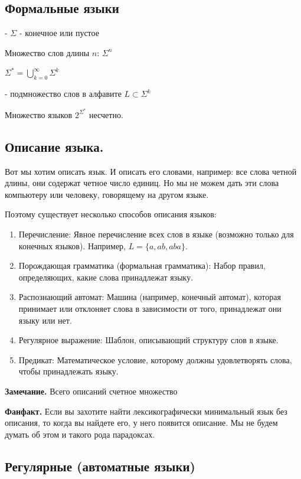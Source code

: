 \subsection{Формальные языки}

 - $\Sigma$ - конечное или пустое

Множество слов длины $n$: $\Sigma^n$ 

$\Sigma^*=\bigcup\limits_{k=0}^\infty \Sigma^k$

 - подмножество слов в алфавите $L \subset \Sigma^k$

 Множество языков $2^{\Sigma^* }$ несчетно.

\subsection{Описание языка.}

Вот мы хотим описать язык. И описать его словами, например: все слова четной длины, они содержат четное число единиц. Но мы не можем дать эти слова компьютеру или человеку, говорящему на другом языке. 

Поэтому существует несколько способов описания языков:
\begin{enumerate}
    \item Перечисление: Явное перечисление всех слов в языке (возможно только для конечных языков). Например, $L = \{a, ab, aba\}$.
    \item Порождающая грамматика (формальная грамматика): Набор правил, определяющих, какие слова принадлежат языку.
    \item Распознающий автомат: Машина (например, конечный автомат), которая принимает или отклоняет слова в зависимости от того, принадлежат они языку или нет.
    \item Регулярное выражение: Шаблон, описывающий структуру слов в языке.
    \item  Предикат: Математическое условие, которому должны удовлетворять слова, чтобы принадлежать языку. 
\end{enumerate}

\textbf{Замечание.} Всего описаний счетное множество

\textbf{Фанфакт.} Если вы захотите найти лексикографически минимальный язык без описания, то когда вы найдете его, у него появится описание. Мы не будем думать об этом и такого рода парадоксах.

\subsection{Регулярные (автоматные языки)}

